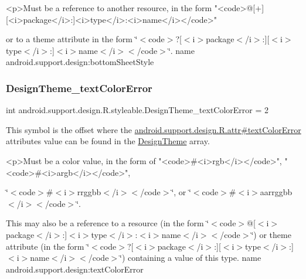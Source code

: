 \begin{DoxyVerb}      <p>Must be a reference to another resource, in the form "<code>@[+][<i>package</i>:]<i>type</i>:<i>name</i></code>"
\end{DoxyVerb}
 or to a theme attribute in the form \char`\"{}$<$code$>$?\mbox{[}$<$i$>$package$<$/i$>$\+:\mbox{]}\mbox{[}$<$i$>$type$<$/i$>$\+:\mbox{]}$<$i$>$name$<$/i$>$$<$/code$>$\char`\"{}.  name android.\+support.\+design\+:bottom\+Sheet\+Style \mbox{\label{classandroid_1_1support_1_1design_1_1R_1_1styleable_a79782f371783faa40fa7a6a6385de284}} 
\subsubsection{\texorpdfstring{Design\+Theme\+\_\+text\+Color\+Error}{DesignTheme\_textColorError}}
{\footnotesize\ttfamily int android.\+support.\+design.\+R.\+styleable.\+Design\+Theme\+\_\+text\+Color\+Error = 2\hspace{0.3cm}{\ttfamily [static]}}

This symbol is the offset where the \hyperlink{classandroid_1_1support_1_1design_1_1R_1_1attr_afc583144784891897393a80c91d4911b}{android.\+support.\+design.\+R.\+attr\#text\+Color\+Error} attribute\textquotesingle{}s value can be found in the \hyperlink{classandroid_1_1support_1_1design_1_1R_1_1styleable_a340277a41103d3ce86cf1861cc50c1c9}{Design\+Theme} array.

\begin{DoxyVerb}      <p>Must be a color value, in the form of "<code>#<i>rgb</i></code>", "<code>#<i>argb</i></code>",
\end{DoxyVerb}
 \char`\"{}$<$code$>$\#$<$i$>$rrggbb$<$/i$>$$<$/code$>$\char`\"{}, or \char`\"{}$<$code$>$\#$<$i$>$aarrggbb$<$/i$>$$<$/code$>$\char`\"{}. 

This may also be a reference to a resource (in the form \char`\"{}$<$code$>$@\mbox{[}$<$i$>$package$<$/i$>$\+:\mbox{]}$<$i$>$type$<$/i$>$\+:$<$i$>$name$<$/i$>$$<$/code$>$\char`\"{}) or theme attribute (in the form \char`\"{}$<$code$>$?\mbox{[}$<$i$>$package$<$/i$>$\+:\mbox{]}\mbox{[}$<$i$>$type$<$/i$>$\+:\mbox{]}$<$i$>$name$<$/i$>$$<$/code$>$\char`\"{}) containing a value of this type.  name android.\+support.\+design\+:text\+Color\+Error \mbox{\label{classandroid_1_1support_1_1design_1_1R_1_1styleable_a559d22c78738e5161420dc4b41689c1b}} 
